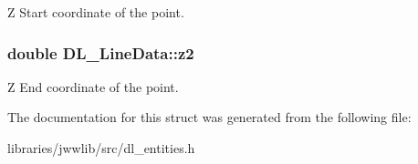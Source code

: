 Z Start coordinate of the point. \hypertarget{structDL__LineData_a88ecf764e9ee25a0357fc4cb85f4fc09}{
\subsubsection[{z2}]{\setlength{\rightskip}{0pt plus 5cm}double D\-L\-\_\-\-Line\-Data\-::z2}}\label{structDL__LineData_a88ecf764e9ee25a0357fc4cb85f4fc09}
Z End coordinate of the point. 

The documentation for this struct was generated from the following file\-:\begin{DoxyCompactItemize}
\item 
libraries/jwwlib/src/dl\-\_\-entities.\-h\end{DoxyCompactItemize}
